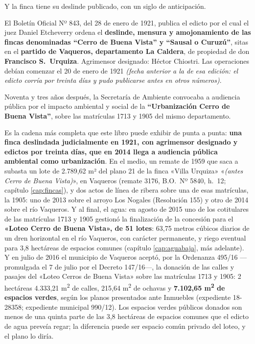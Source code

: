 \begin{cautela}
Y la finca tiene su deslinde publicado, con un siglo de anticipación.

El Boletín Oficial Nº 843, del 28 de enero de 1921, publica el edicto por el cual el juez Daniel Etcheverry ordena el \textbf{deslinde, mensura y amojonamiento de las fincas denominadas ``Cerro de Buena Vista'' y ``Sausal o Curuzú''}, sitas en el \textbf{partido de Vaqueros, departamento La Caldera}, de propiedad de don \textbf{Francisco S.\ Urquiza}. Agrimensor designado: Héctor Chiostri. Las operaciones debían comenzar el 20 de enero de 1921 \textit{(fecha anterior a la de esa edición: el edicto corría por treinta días y pudo publicarse antes en otros números)}.

Noventa y tres años después, la Secretaría de Ambiente convocaba a audiencia pública por el impacto ambiental y social de la \textbf{``Urbanización Cerro de Buena Vista''}, sobre las matrículas 1713 y 1905 del mismo departamento.

Es la cadena más completa que este libro puede exhibir de punta a punta: \textbf{una finca deslindada judicialmente en 1921, con agrimensor designado y edictos por treinta días, que en 2014 llega a audiencia pública ambiental como urbanización}. En el medio, un remate de 1959 que saca a subasta un lote de 2.789,62 m² del plano 21 de la finca «Villa Urquiza» «\textit{(antes Cerro de Buena Vista)}», en Vaqueros (remate 3176, B.O.\ Nº 5840, h.\ 12; capítulo \ref{cap:fincas}), y dos actos de línea de ribera sobre una de esas matrículas, la 1905: uno de 2013 sobre el arroyo Los Nogales (Resolución 155) y otro de 2014 sobre el río Vaqueros. Y al final, el agua: en agosto de 2015 uno de los cotitulares de las matrículas 1713 y 1905 gestionó la finalización de la concesión para el \textbf{«Loteo Cerro de Buena Vista», de 51 lotes}: 63,75 metros cúbicos diarios de un dren horizontal en el río Vaqueros, con carácter permanente, y riego eventual para 3,8 hectáreas de espacios comunes (capítulo \ref{cap:aguabaja}, más adelante). Y en julio de 2016 el municipio de Vaqueros aceptó, por la Ordenanza 495/16 ---promulgada el 7 de julio por el Decreto 147/16---, la donación de las calles y pasajes del «Loteo Cerros de Buena Vista» sobre las matrículas 1713 y 1905: 2 hectáreas 4.333,21 m\textsuperscript{2} de calles, 215,64 m\textsuperscript{2} de ochavas y \textbf{7.102,65 m\textsuperscript{2} de espacios verdes}, según los planos presentados ante Inmuebles (expediente 18-28358; expediente municipal 990/12). Los espacios verdes públicos donados son menos de una quinta parte de las 3,8 hectáreas de espacios comunes que el edicto de agua preveía regar; la diferencia puede ser espacio común privado del loteo, y el plano lo diría.


\end{cautela}
